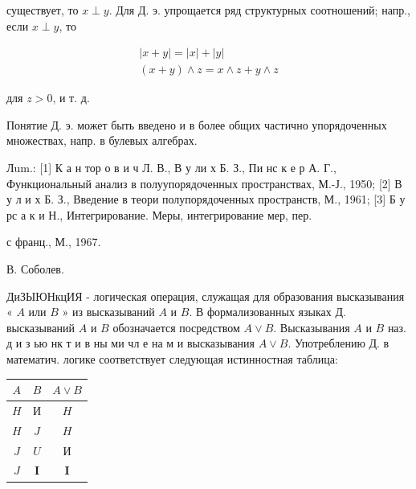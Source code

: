 \documentclass[10pt]{article}
\begin{document}
существует, то $x \perp y$. Для Д. э. упрощается ряд структурных соотношений; напр., если $x \perp y$, то



\[

\begin{gathered}

|x+y|=|x|+|y| \\

(x+y) \wedge z=x \wedge z+y \wedge z

\end{gathered}

\]



для $z>0$, и т. д.



Понятие Д. э. может быть введено и в более общих частично упорядоченных множествах, напр. в булевых алгебрах.



Лum.: [1] К а н тор о в и ч Л. В., В у ли х Б. З., Пи нс к е р А. Г., Функциональный анализ в полуупорядоченных пространствах, М.-Ј., 1950; [2] В у л и х Б. З., Введение в теори полупорядоченных пространств, М., 1961; [3] Б у рс а к и Н., Интегрирование. Меры, интегрирование мер, пер.

с франц., М., 1967.

В. Соболев.



ДиЗЫЮНкцИЯ - логическая операция, служащая для образования высказывания « $A$ или $B$ » из высказываний $A$ и $B$. В формализованных языках Д. высказываний $A$ и $B$ обозначается посредством $A \vee B$. Высказывания $A$ и $B$ наз. д и з ью нк т и в ны ми чл е на м и высказывания $A \vee B$. Употреблению Д. в математич. логике соответствует следующая истинностная таблица:



\begin{center}

\begin{tabular}{c|c|c}

$A$ & $B$ & $A \vee B$ \\

\hline

$H$ & $И$ & $H$ \\

$H$ & $J$ & $H$ \\

$J$ & $U$ & $И$ \\

$J$ & $\boldsymbol{I}$ & $\boldsymbol{I}$ \\

\hline

\end{tabular}

\end{center}
\end{document}
